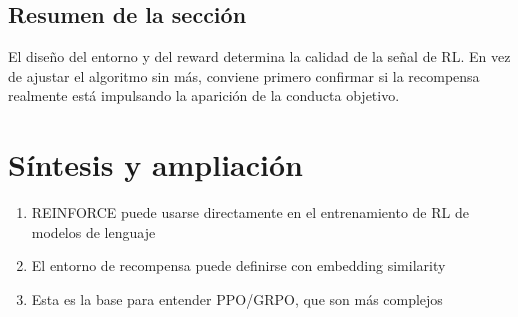 \documentclass[a4paper]{article}
\begin{document}
\subsection{Resumen de la sección}
El diseño del entorno y del reward determina la calidad de la señal de RL. En vez de ajustar el algoritmo sin más, conviene primero confirmar si la recompensa realmente está impulsando la aparición de la conducta objetivo.

\newpage
\section{Síntesis y ampliación}
\begin{enumerate}
  \item REINFORCE puede usarse directamente en el entrenamiento de RL de modelos de lenguaje
  \item El entorno de recompensa puede definirse con embedding similarity
  \item Esta es la base para entender PPO/GRPO, que son más complejos
\end{enumerate}
\end{document}
